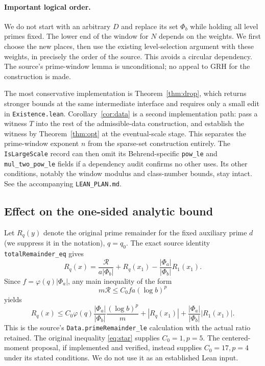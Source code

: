 \documentclass[11pt]{article}
\theoremstyle{remark}\newtheorem{remark}[theorem]{Remark}
\newcommand{\src}[1]{\texttt{#1}}
\begin{document}
\paragraph{Important logical order.} We do not start with an arbitrary $D$ and replace its set $\Phi_b$ while holding all level primes fixed. The lower end of the window for $N$ depends on the weights. We first choose the new places, then use the existing level-selection argument with these weights, in precisely the order of the source. This avoids a circular dependency. The source's prime-window lemma is unconditional; no appeal to GRH for the construction is made.

The most conservative implementation is Theorem~\ref{thm:drop}, which returns stronger bounds at the same intermediate interface and requires only a small edit in \src{Existence.lean}. Corollary~\ref{cor:data} is a second implementation path: pass a witness $T$ into the rest of the admissible-data construction, and establish the witness by Theorem~\ref{thm:opt} at the eventual-scale stage. This separates the prime-window exponent $n$ from the sparse-set construction entirely. The \src{IsLargeScale} record can then omit its Behrend-specific \src{pow\_le} and \src{mul\_two\_pow\_le} fields if a dependency audit confirms no other uses. Its other conditions, notably the window modulus and class-number bounds, stay intact. See the accompanying \src{LEAN\_PLAN.md}.

\subsection{Effect on the one-sided analytic bound}
Let $R_q(y)$ denote the original prime remainder for the fixed auxiliary prime $d$ (we suppress it in the notation), $q=q_0$. The exact source identity \src{totalRemainder\_eq} gives
\[
 R_q(x)=\frac{\mathcal R}{a|\Phi_b|}+R_q(x_1)
         -\frac{|\Phi_a|}{|\Phi_b|}R_1(x_1).
\]
Since $f=\varphi(q)|\Phi_a|$, any main inequality of the form
\begin{equation}\label{eq:generic}
 m\mathcal R\le C_0 fa(\log b)^p
\end{equation}
yields
\begin{equation}\label{eq:remainder}
 R_q(x)\le C_0\varphi(q)\frac{|\Phi_a|}{|\Phi_b|}
 \frac{(\log b)^p}{m}+|R_q(x_1)|+
 \frac{|\Phi_a|}{|\Phi_b|}|R_1(x_1)|.
\end{equation}
This is the source's \src{Data.primeRemainder\_le} calculation with the actual ratio retained. The original inequality \eqref{eq:star} supplies $C_0=1,p=5$. The centered-moment proposal, if implemented and verified, instead supplies $C_0=17,p=4$ under its stated conditions. We do not use it as an established Lean input.
\end{document}
